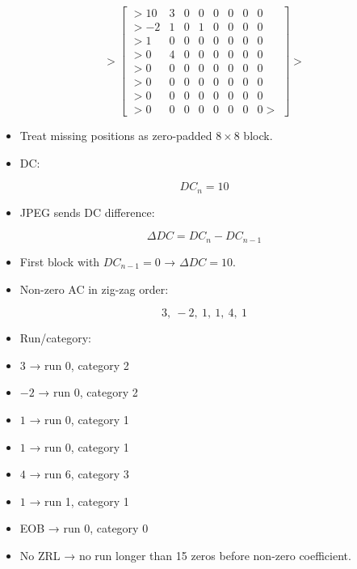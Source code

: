 $$
> \begin{bmatrix}
> 10 & 3 & 0 & 0 & 0 & 0 & 0 & 0 \\
> -2 & 1 & 0 & 1 & 0 & 0 & 0 & 0 \\
> 1 & 0 & 0 & 0 & 0 & 0 & 0 & 0 \\
> 0 & 4 & 0 & 0 & 0 & 0 & 0 & 0 \\
> 0 & 0 & 0 & 0 & 0 & 0 & 0 & 0 \\
> 0 & 0 & 0 & 0 & 0 & 0 & 0 & 0 \\
> 0 & 0 & 0 & 0 & 0 & 0 & 0 & 0 \\
> 0 & 0 & 0 & 0 & 0 & 0 & 0 & 0
> \end{bmatrix}
> $$


\begin{itemize}
  \item Treat missing positions as zero-padded $8\times8$ block.
  \item DC:
\end{itemize}


$$
DC_n=10
$$


\begin{itemize}
  \item JPEG sends DC difference:
\end{itemize}


$$
\Delta DC = DC_n-DC_{n-1}
$$


\begin{itemize}
  \item First block with $DC_{n-1}=0$ → $\Delta DC=10$.
  \item Non-zero AC in zig-zag order:
\end{itemize}


$$
3,\ -2,\ 1,\ 1,\ 4,\ 1
$$


\begin{itemize}
  \item Run/category:
  \item $3$ → run 0, category 2
  \item $-2$ → run 0, category 2
  \item $1$ → run 0, category 1
  \item $1$ → run 0, category 1
  \item $4$ → run 6, category 3
  \item $1$ → run 1, category 1
  \item EOB → run 0, category 0
  \item No ZRL → no run longer than 15 zeros before non-zero coefficient.
\end{itemize}




